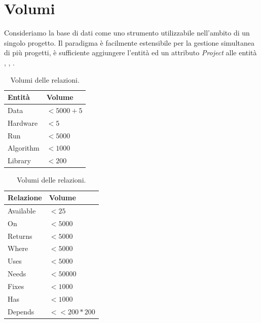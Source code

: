 \documentclass{article}
\begin{document}
\section{Volumi}
Consideriamo la base di dati come uno strumento utilizzabile nell'ambito di un singolo progetto. Il paradigma è facilmente estensibile per la gestione simultanea di più progetti, è sufficiente aggiungere l'entità  ed un attributo \emph{Project} alle entità , , .
\begin{table}[H]
    \begin{minipage}{.5\linewidth}
      \vspace{1.2cm}
      \centering
      \begin{tabular}{||l l||}
        \hline
        Entità & Volume \\ [0.5ex]
        \hline\hline
        Data & $<5000 + 5$\\
        Hardware & $<5$\\
        Run & $<5000$\\
        Algorithm & $<1000$\\
        Library & $<200$\\
        \hline
       \end{tabular}
       \caption{Volumi delle entità.}
    \end{minipage}
    \begin{minipage}{.5\linewidth}
      \vspace{-0.5cm}
      \centering
        \begin{tabular}{||l l||}
            \hline
            Relazione & Volume \\ [0.5ex]
            \hline\hline
            Available & $<25$\\
            On & $<5000$\\
            Returns & $<5000$\\
            Where & $<5000$\\
            Uses & $<5000$\\
            Needs & $<50000$\\
            Fixes & $<1000$\\
            Has & $<1000$\\
            Depends & $<<200*200$\\
            \hline
           \end{tabular}
           \caption{Volumi delle relazioni.}
    \end{minipage}
\end{table}
\end{document}
